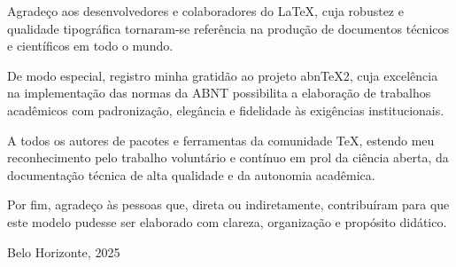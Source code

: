 \begin{agradecimentos}
    Agradeço aos desenvolvedores e colaboradores do \LaTeX{}, cuja robustez e qualidade tipográfica tornaram-se referência na produção de documentos técnicos e científicos em todo o mundo.

    De modo especial, registro minha gratidão ao projeto abn\TeX 2, cuja excelência na implementação das normas da ABNT possibilita a elaboração de trabalhos acadêmicos com padronização, elegância e fidelidade às exigências institucionais.

    A todos os autores de pacotes e ferramentas da comunidade \TeX{}, estendo meu reconhecimento pelo trabalho voluntário e contínuo em prol da ciência aberta, da documentação técnica de alta qualidade e da autonomia acadêmica.

    Por fim, agradeço às pessoas que, direta ou indiretamente, contribuíram para que este modelo pudesse ser elaborado com clareza, organização e propósito didático.

    \begin{flushright}
    Belo Horizonte, 2025
    \end{flushright}
\end{agradecimentos}
